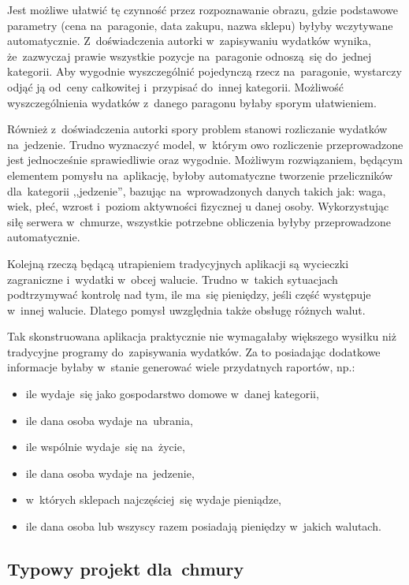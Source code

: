 \documentclass[12pt,a4paper,twoside,titlepage,openright]{book}
\begin{document}
Jest możliwe ułatwić tę czynność przez rozpoznawanie obrazu, gdzie podstawowe parametry (cena na~paragonie, data zakupu, nazwa sklepu) byłyby wczytywane automatycznie. Z~doświadczenia autorki w~zapisywaniu wydatków wynika, że~zazwyczaj prawie wszystkie pozycje na~paragonie odnoszą~się do~jednej kategorii. Aby wygodnie wyszczególnić pojedynczą rzecz na~paragonie, wystarczy odjąć ją od~ceny całkowitej i~przypisać do~innej kategorii. Możliwość wyszczególnienia wydatków z~danego paragonu byłaby sporym ułatwieniem.

Również z~doświadczenia autorki spory problem stanowi rozliczanie wydatków na~jedzenie. Trudno wyznaczyć model, w~którym owo rozliczenie przeprowadzone jest jednocześnie sprawiedliwie oraz wygodnie. Możliwym rozwiązaniem, będącym elementem pomysłu na~aplikację, byłoby automatyczne tworzenie przeliczników dla~kategorii ,,jedzenie'', bazując na~wprowadzonych danych takich jak: waga, wiek, płeć, wzrost i~poziom aktywności fizycznej u danej osoby. Wykorzystując siłę serwera w~chmurze, wszystkie potrzebne obliczenia byłyby przeprowadzone automatycznie.

Kolejną rzeczą będącą utrapieniem tradycyjnych aplikacji są wycieczki zagraniczne i~wydatki w~obcej walucie. Trudno w~takich sytuacjach podtrzymywać kontrolę nad tym, ile ma~się pieniędzy, jeśli część występuje w~innej walucie. Dlatego pomysł uwzględnia także obsługę różnych walut.

Tak skonstruowana aplikacja praktycznie nie wymagałaby większego wysiłku niż tradycyjne programy do~zapisywania wydatków. Za to posiadając dodatkowe informacje byłaby w~stanie generować wiele przydatnych raportów, np.:
\begin{itemize}
\item ile wydaje~się jako gospodarstwo domowe w~danej kategorii,
\item ile dana osoba wydaje na~ubrania,
\item ile wspólnie wydaje~się na~życie,
\item ile dana osoba wydaje na~jedzenie,
\item w~których sklepach najczęściej~się wydaje pieniądze,
\item ile dana osoba lub wszyscy razem posiadają pieniędzy w~jakich walutach.
\end{itemize}

\subsection{Typowy projekt dla~chmury}
\end{document}

